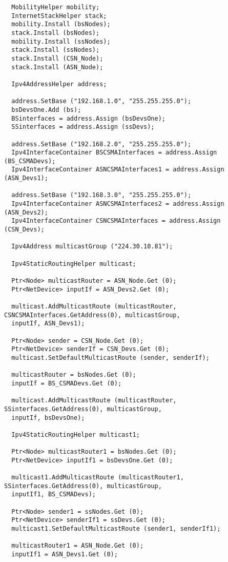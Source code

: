 \documentclass[14pt,a4paper]{article}
\begin{document}
{\begin{verbatim}
  MobilityHelper mobility;
  InternetStackHelper stack;
  mobility.Install (bsNodes);
  stack.Install (bsNodes);
  mobility.Install (ssNodes);
  stack.Install (ssNodes);
  stack.Install (CSN_Node);
  stack.Install (ASN_Node);

  Ipv4AddressHelper address;

  address.SetBase ("192.168.1.0", "255.255.255.0");
  bsDevsOne.Add (bs);
  BSinterfaces = address.Assign (bsDevsOne);
  SSinterfaces = address.Assign (ssDevs);

  address.SetBase ("192.168.2.0", "255.255.255.0");
  Ipv4InterfaceContainer BSCSMAInterfaces = address.Assign (BS_CSMADevs);
  Ipv4InterfaceContainer ASNCSMAInterfaces1 = address.Assign (ASN_Devs1);

  address.SetBase ("192.168.3.0", "255.255.255.0");
  Ipv4InterfaceContainer ASNCSMAInterfaces2 = address.Assign (ASN_Devs2);
  Ipv4InterfaceContainer CSNCSMAInterfaces = address.Assign (CSN_Devs);

  Ipv4Address multicastGroup ("224.30.10.81");

  Ipv4StaticRoutingHelper multicast;
  
  Ptr<Node> multicastRouter = ASN_Node.Get (0); 
  Ptr<NetDevice> inputIf = ASN_Devs2.Get (0); 

  multicast.AddMulticastRoute (multicastRouter, CSNCSMAInterfaces.GetAddress(0), multicastGroup, 
  inputIf, ASN_Devs1);

  Ptr<Node> sender = CSN_Node.Get (0);
  Ptr<NetDevice> senderIf = CSN_Devs.Get (0);
  multicast.SetDefaultMulticastRoute (sender, senderIf);

  multicastRouter = bsNodes.Get (0); 
  inputIf = BS_CSMADevs.Get (0); 

  multicast.AddMulticastRoute (multicastRouter, SSinterfaces.GetAddress(0), multicastGroup, 
  inputIf, bsDevsOne);

  Ipv4StaticRoutingHelper multicast1;
  
  Ptr<Node> multicastRouter1 = bsNodes.Get (0); 
  Ptr<NetDevice> inputIf1 = bsDevsOne.Get (0); 

  multicast1.AddMulticastRoute (multicastRouter1, SSinterfaces.GetAddress(0), multicastGroup, 
  inputIf1, BS_CSMADevs);

  Ptr<Node> sender1 = ssNodes.Get (0);
  Ptr<NetDevice> senderIf1 = ssDevs.Get (0);
  multicast1.SetDefaultMulticastRoute (sender1, senderIf1);

  multicastRouter1 = ASN_Node.Get (0); 
  inputIf1 = ASN_Devs1.Get (0); 


\end{verbatim}}
\end{document}
